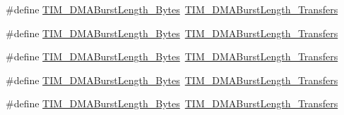 \begin{DoxyCompactItemize}
\#define \hyperlink{group___t_i_m___legacy_gae1e210b9c3609e854e05c3594aa01c01}{T\+I\+M\+\_\+\+D\+M\+A\+Burst\+Length\+\_\+Bytes}~\hyperlink{group___t_i_m___d_m_a___burst___length_gab1a097ca7404e518839df99795443fb0}{T\+I\+M\+\_\+\+D\+M\+A\+Burst\+Length\+\_\+Transfers}
\item 
\#define \hyperlink{group___t_i_m___legacy_ga3ca90d9fa3c80590175ba42baac57098}{T\+I\+M\+\_\+\+D\+M\+A\+Burst\+Length\+\_\+Bytes}~\hyperlink{group___t_i_m___d_m_a___burst___length_gad13373f5fd246557a4fc487dc43c37ec}{T\+I\+M\+\_\+\+D\+M\+A\+Burst\+Length\+\_\+Transfers}
\item 
\#define \hyperlink{group___t_i_m___legacy_ga672117a7dafcd778fe8e86db423b07e9}{T\+I\+M\+\_\+\+D\+M\+A\+Burst\+Length\+\_\+Bytes}~\hyperlink{group___t_i_m___d_m_a___burst___length_gafb644e6033f7b46c602b02754b69fde0}{T\+I\+M\+\_\+\+D\+M\+A\+Burst\+Length\+\_\+Transfers}
\item 
\#define \hyperlink{group___t_i_m___legacy_gacffd0dc1f04aa06624a4980dcae6eede}{T\+I\+M\+\_\+\+D\+M\+A\+Burst\+Length\+\_\+Bytes}~\hyperlink{group___t_i_m___d_m_a___burst___length_ga5b2c97f650a3c1726965187d852b8cc5}{T\+I\+M\+\_\+\+D\+M\+A\+Burst\+Length\+\_\+Transfers}
\item 
\#define \hyperlink{group___t_i_m___legacy_ga9c4d457417b1ba72ed0ae9886a75547a}{T\+I\+M\+\_\+\+D\+M\+A\+Burst\+Length\+\_\+Bytes}~\hyperlink{group___t_i_m___d_m_a___burst___length_gaed9f2afef174079f6eb6927abd995b9b}{T\+I\+M\+\_\+\+D\+M\+A\+Burst\+Length\+\_\+Transfers}
\end{DoxyCompactItemize}
